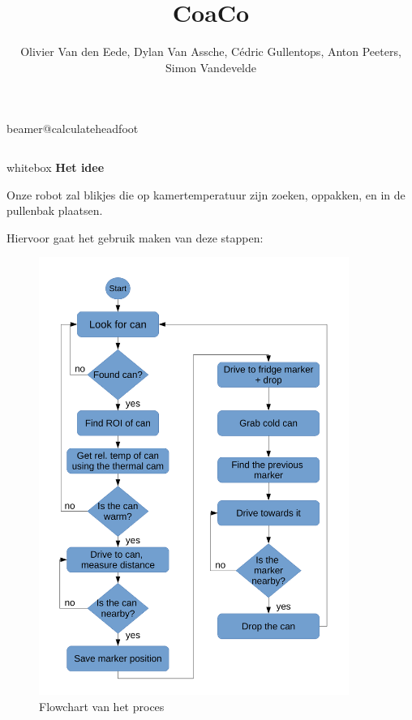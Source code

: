 \documentclass{beamer}
\title{CoaCo}
\author{\large Olivier Van den Eede, Dylan Van Assche, C\'edric Gullentops, Anton Peeters, Simon Vandevelde}
\institute{\large Faculteit Industriële ingenieurswetenschappen / Elektronica - ICT}
\begin{document}
\csname beamer@calculateheadfoot\endcsname %

\begin{frame}[t]

\vspace{2.5\baseh} %





\vspace{.4\baseh}
\begin{columns}[t]
	\begin{column}{\textwidth}

	\begin{beamercolorbox}{whitebox}
	\justifying
	{\bfseries Het idee}
	
	Onze robot zal blikjes die op kamertemperatuur zijn zoeken, oppakken, en in de pullenbak plaatsen.

	Hiervoor gaat het gebruik maken van deze stappen:
	\begin{figure}
	  \centering
	  \includegraphics[width=0.9\textwidth]{../../Docs/general_flow.pdf}
	  \caption{Flowchart van het proces}


\end{figure}
\end{beamercolorbox}
\end{column}
\end{columns}
\end{frame}
\end{document}
